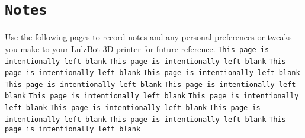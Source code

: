 %
%
%
%
%

\section{\texttt{Notes}}
Use the following pages to record notes and any personal preferences or tweaks you make to your LulzBot 3D printer for future reference.
\thispagestyle{empty}
\begingroup
\newpage
\mbox{}
\null
\vfill
\thispagestyle{empty}
\texttt{This page is intentionally left blank}
\newpage
\mbox{}
\null
\vfill
\thispagestyle{empty}
\texttt{This page is intentionally left blank}
\newpage
\mbox{}
\null
\vfill
\thispagestyle{empty}
\texttt{This page is intentionally left blank}
\newpage
\mbox{}
\null
\vfill
\thispagestyle{empty}
\texttt{This page is intentionally left blank}
\newpage
\mbox{}
\null
\vfill
\thispagestyle{empty}
\texttt{This page is intentionally left blank}
\newpage
\mbox{}
\null
\vfill
\thispagestyle{empty}
\texttt{This page is intentionally left blank}
\newpage
\mbox{}
\null
\vfill
\thispagestyle{empty}
\texttt{This page is intentionally left blank}
\newpage
\mbox{}
\null
\vfill
\thispagestyle{empty}
\texttt{This page is intentionally left blank}
\newpage
\mbox{}
\null
\vfill
\thispagestyle{empty}
\texttt{This page is intentionally left blank}
\newpage
\mbox{}
\null
\vfill
\thispagestyle{empty}
\texttt{This page is intentionally left blank}
\newpage
\mbox{}
\null
\vfill
\thispagestyle{empty}
\texttt{This page is intentionally left blank}
\newpage
\mbox{}
\null
\vfill
\thispagestyle{empty}
\texttt{This page is intentionally left blank}
\endgroup
